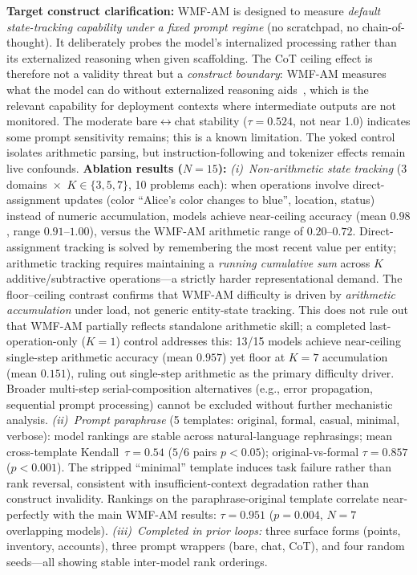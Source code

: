 \documentclass{article}
\begin{document}
\textbf{Target construct clarification:} WMF-AM is designed to measure
\emph{default state-tracking capability under a fixed prompt regime}
(no scratchpad, no chain-of-thought). It deliberately probes the
model's internalized processing rather than its externalized reasoning
when given scaffolding. The CoT ceiling effect is therefore not a
validity threat but a \emph{construct boundary}: WMF-AM measures what
the model can do without externalized reasoning
aids~\citep{nye2021show}, which is the relevant capability for
deployment contexts where intermediate outputs are not monitored. The moderate bare$\leftrightarrow$chat stability
($\tau = 0.524$, not near 1.0) indicates some prompt sensitivity
remains; this is a known limitation.
The yoked control isolates arithmetic parsing, but instruction-following
and tokenizer effects remain live confounds.
\textbf{Ablation results ($N{=}15$):}
\emph{(i)~Non-arithmetic state tracking}
(3 domains~$\times$~$K\in\{3,5,7\}$, 10 problems each):
when operations involve direct-assignment updates (color
``Alice's color changes to blue'', location, status) instead of
numeric accumulation, models achieve near-ceiling accuracy
(mean $0.98$, range $0.91$--$1.00$), versus the WMF-AM arithmetic
range of $0.20$--$0.72$.
Direct-assignment tracking is solved by remembering the most recent
value per entity; arithmetic tracking requires maintaining a
\emph{running cumulative sum} across $K$ additive/subtractive
operations---a strictly harder representational demand.
The floor--ceiling contrast confirms that WMF-AM difficulty is
driven by \emph{arithmetic accumulation} under load,
not generic entity-state tracking.
This does not rule out that WMF-AM partially reflects standalone
arithmetic skill; a completed last-operation-only ($K{=}1$) control
addresses this: 13/15 models achieve near-ceiling single-step
arithmetic accuracy (mean $0.957$) yet floor at $K{=}7$ accumulation
(mean $0.151$), ruling out single-step arithmetic as the primary
difficulty driver. Broader multi-step serial-composition alternatives
(e.g., error propagation, sequential prompt processing) cannot be
excluded without further mechanistic analysis.
\emph{(ii)~Prompt paraphrase}
(5 templates: original, formal, casual, minimal, verbose):
model rankings are stable across natural-language rephrasings;
mean cross-template Kendall~$\tau = 0.54$ ($5/6$ pairs $p < 0.05$);
original-vs-formal $\tau = 0.857$ ($p < 0.001$).
The stripped ``minimal'' template induces task failure rather than rank
reversal, consistent with insufficient-context degradation rather
than construct invalidity.
Rankings on the paraphrase-original template correlate
near-perfectly with the main WMF-AM results:
$\tau = 0.951$ ($p = 0.004$, $N{=}7$ overlapping models).
\emph{(iii)~Completed in prior loops:} three surface forms (points,
inventory, accounts), three prompt wrappers (bare, chat, CoT),
and four random seeds---all showing stable inter-model rank orderings.
\end{document}
